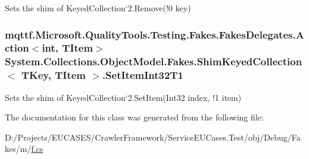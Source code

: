 Sets the shim of Keyed\-Collection`2.Remove(!0 key)

\hypertarget{class_system_1_1_collections_1_1_object_model_1_1_fakes_1_1_shim_keyed_collection_3_01_t_key_00_01_t_item_01_4_a97d9cf31c2ef2afee1d643e75849ffe2}{
\subsubsection[{Set\-Item\-Int32\-T1}]{\setlength{\rightskip}{0pt plus 5cm}mqttf.\-Microsoft.\-Quality\-Tools.\-Testing.\-Fakes.\-Fakes\-Delegates.\-Action$<$int, T\-Item$>$ System.\-Collections.\-Object\-Model.\-Fakes.\-Shim\-Keyed\-Collection$<$ T\-Key, T\-Item $>$.Set\-Item\-Int32\-T1\hspace{0.3cm}{\ttfamily [set]}}}\label{class_system_1_1_collections_1_1_object_model_1_1_fakes_1_1_shim_keyed_collection_3_01_t_key_00_01_t_item_01_4_a97d9cf31c2ef2afee1d643e75849ffe2}


Sets the shim of Keyed\-Collection`2.Set\-Item(Int32 index, !1 item)



The documentation for this class was generated from the following file\-:\begin{DoxyCompactItemize}
\item 
D\-:/\-Projects/\-E\-U\-C\-A\-S\-E\-S/\-Crawler\-Framework/\-Service\-E\-U\-Cases.\-Test/obj/\-Debug/\-Fakes/m/\hyperlink{m_2f_8cs}{f.\-cs}\end{DoxyCompactItemize}
